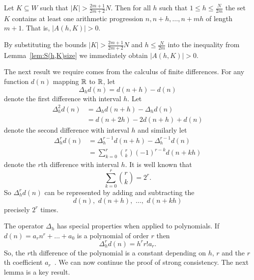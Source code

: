 \documentclass[journal]{IEEEtran}
\begin{document}
 \begin{corollary} \label{cor:S(h,K)>0}
 Let $K \subseteq W$ such that $|K| > \frac{2m+1}{2m+2}N$. Then for all $h$ such that $1\leq h \leq\frac{N}{2m}$ the set $K$ contains at least one arithmetic progression $n, n+h, \dots, n+mh$ of length $m+1$. That is, $|A(h,K)| > 0$.
 \end{corollary}
 \begin{IEEEproof}
 By substituting the bounds $|K| > \frac{2m+1}{2m+2}N$ and $h \leq\frac{N}{2m}$ into the inequality from Lemma~\ref{lem:S(h,K)size} we immediately obtain $|A(h,K)| > 0$.
 \end{IEEEproof}

The next result we require comes from the calculus of finite differences. For any function $d(n)$ mapping ${\mathbb R}$ to ${\mathbb R}$, let 
\[
\Delta_h d(n) = d(n+h) - d(n)
\] 
denote the first difference with interval $h$. Let 
\begin{align*}
\Delta_h^2 d(n) &= \Delta_h d(n+h) - \Delta_h d(n) 
\\ &= d(n+2h) - 2d(n+h) + d(n)
\end{align*}
denote the second difference with interval $h$ and similarly let 
\begin{equation}\label{eq:mthdiffformula}
\begin{split}
\Delta_h^r d(n) &= \Delta_h^{r-1} d(n+h) - \Delta_h^{r-1} d(n)
\\ &= \sum_{k=0}^{r}\binom{r}{k}(-1)^{r-k}d(n+kh)
\end{split}
\end{equation}
denote the $r$th difference with interval $h$. It is well known that 
\[
\sum_{k=0}^{r}\binom{r}{k} = 2^r.
\] 
So $\Delta_h^r d(n)$ can be represented by adding and subtracting the 
\[
d(n), \,\, d(n+h), \,\, \dots, \,\, d(n+kh)
\] 
precisely $2^r$ times.

The operator $\Delta_h$ has special properties when applied to polynomials. If $d(n) = a_r n^r + \dots + a_0$ is a polynomial of order $r$ then
 \begin{equation} \label{eq:mfinitediffpoly}
 \Delta_h^r d(n) = h^r r! a_r. 
 \end{equation}
So, the $r$th difference of the polynomial is a constant depending on $h$, $r$ and the $r$th coefficient $a_r$~\cite[page 51]{Jordan_Calculus_of_finite_difference_1965}.  We can now continue the proof of strong consistency.  The next lemma is a key result.
\end{document}

